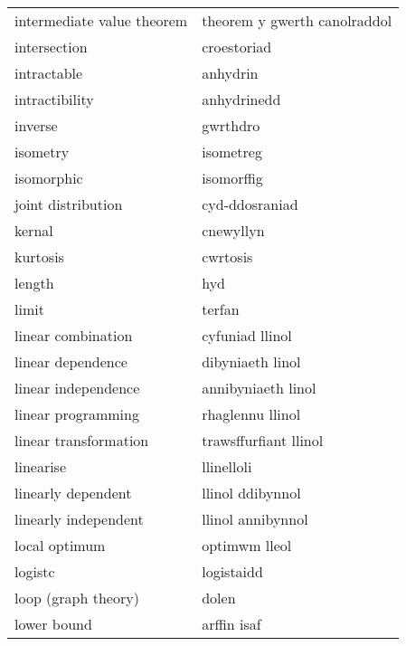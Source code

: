 \begin{supertabular}{p{0.22\textwidth}p{0.22\textwidth}}
      intermediate value theorem &    theorem y gwerth canolraddol \\
                    intersection &                     croestoriad \\
                     intractable &                        anhydrin \\
                  intractibility &                     anhydrinedd \\
                         inverse &                        gwrthdro \\
                        isometry &                       isometreg \\
                      isomorphic &                      isomorffig \\
              joint distribution &                  cyd-ddosraniad \\
                          kernal &                       cnewyllyn \\
                        kurtosis &                        cwrtosis \\
                          length &                             hyd \\
                           limit &                          terfan \\
              linear combination &                 cyfuniad llinol \\
               linear dependence &                dibyniaeth linol \\
             linear independence &              annibyniaeth linol \\
              linear programming &                rhaglennu llinol \\
           linear transformation &           trawsffurfiant llinol \\
                       linearise &                      llinelloli \\
              linearly dependent &                llinol ddibynnol \\
            linearly independent &               llinol annibynnol \\
                   local optimum &                   optimwm lleol \\
                         logistc &                      logistaidd \\
             loop (graph theory) &                           dolen \\
                     lower bound &                     arffin isaf \\

\end{supertabular}
